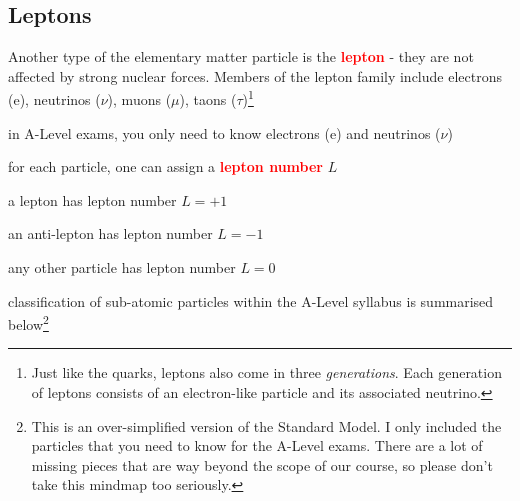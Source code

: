 \documentclass[a4paper,12pt]{book}
\newcommand{\cmt}{}
\newcommand{\keypoint}[1]{\textbf{\textcolor{red}{#1}}}
\newcommand{\keypoint}[1]{\textbf{\textcolor{red}{#1}}}
\newcommand{\cmt}{}
\begin{document}
\subsection{Leptons}

Another type of the elementary matter particle is the \keypoint{lepton} - they are not affected by strong nuclear forces. Members of the lepton family include electrons (e), neutrinos ($\nu$), muons ($\mu$), taons ($\tau$)\footnote{Just like the quarks, leptons also come in three \emph{generations}. Each generation of leptons consists of an electron-like particle and its associated neutrino.}

in A-Level exams, you only need to know electrons (e) and neutrinos ($\nu$)

\cmt for each particle, one can assign a \keypoint{lepton number} $L$

\begin{compactitem}
	\item[--] a lepton has lepton number $L=+1$
	
	\item[--] an anti-lepton has lepton number $L=-1$
	
	 \item[--]any other particle has lepton number $L=0$
\end{compactitem}

classification of sub-atomic particles within the A-Level syllabus is summarised below\footnote[][-2cm]{This is an over-simplified version of the Standard Model. I only included the particles that you need to know for the A-Level exams. There are a lot of missing pieces that are way beyond the scope of our course, so please don't take this mindmap too seriously.}
\end{document}
